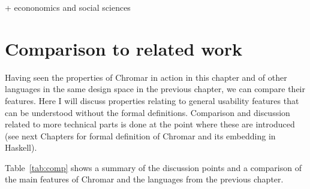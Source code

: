 + econonomics and social sciences




\section{Comparison to related work}
Having seen the properties of Chromar in action in this chapter and of other
languages in the same design space in the previous chapter, we can compare their
features. Here I will discuss properties relating to general usability features
that can be understood without the formal definitions. Comparison and discussion
related to more technical parts is done at the point where these are introduced
(see next Chapters for formal definition of Chromar and its embedding in
Haskell).

Table~\ref{tab:comp} shows a summary of the discussion points and a comparison
of the main features of Chromar and the languages from the previous chapter.

